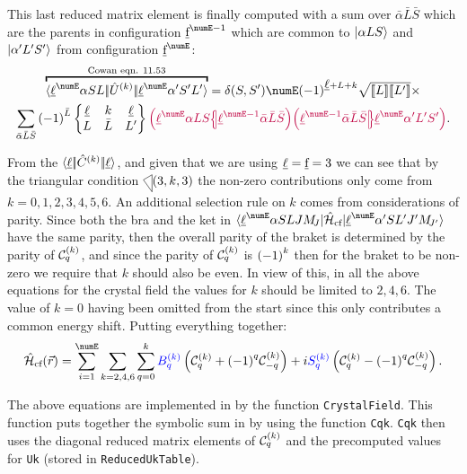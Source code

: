 \documentclass{article}
\newcommand{\codetext}[1]{{\color{BlueViolet} \texttt{#1}}}
\begin{document}
    This last reduced matrix element is finally computed with a sum over $\bar{\alpha}\bar{L}\bar{S}$ which are the parents in configuration $\forb^{\numE-1}$ which are common to $|\alpha L S\rangle$ and $|\alpha' L' S'\rangle$ from configuration $\forb^{\numE}$:
    \begin{multline}
    \overbracket{\redbraopket{\lorb^\numE \alpha S L} 
        {\op{U}^{(k)}}
        {\lorb^\numE \alpha' S' L'}}^{\text{Cowan eqn. 11.53}} = \kronecker{S}{S'} \numE \phaser{\lorb + L + k}
            \sqrt{\tpobraket{L}\tpobraket{L'}} \times \\
    \sum_{\bar{\alpha}\bar{L}\bar{S}} 
        \phaser{\bar{L}} \sixj{\lorb}{k}{\lorb}{L}{\bar{L}}{L'}
        \cfpinv{\lorb^\numE \alpha L S}
            {\lorb^{\numE - 1}\bar{\alpha}\bar{L}\bar{S}}
        \cfp{\lorb^{\numE -1}\bar{\alpha}\bar{L}\bar{S}}{\lorb^\numE\alpha'L'S'}.
    \label{eqn:ReducedUk}
    \end{multline}

    From the $\langle \underbar{$\ell$}|\!|\hat{C}^{(k)}|\!|\underbar{$\ell$}\rangle$, and given that we are using $\underbar{$\ell$} = \underbar{$\text{f}$} = 3$ we can see that by the triangular condition $\tricondition{3,k,3}$ the non-zero contributions only come from $k=0,1,2,3,4,5,6$. An additional selection rule on $k$ comes from considerations of parity. Since both the bra and the ket in $\braopket{\lorb^\numE \alpha SLJ \Msub{J}}{\hamCrystalFieldSymbol}{\lorb^\numE \alpha'S L' J' \Msub{J'}}$ have the same parity, then the overall parity of the braket is determined by the parity of $\mathcal{C}^{(k)}_{q}$, and since the parity of $\mathcal{C}^{(k)}_{q}$ is ${(-1)}^{k}$ then for the braket to be non-zero we require that $k$ should also be even. In view of this, in all the above equations for the crystal field the values for $k$ should be limited to $2,4,6$. The value of $k=0$ having been omitted from the start since this only contributes a common energy shift. Putting everything together:
       	\begin{equation}
        \hamCrystalFieldSymbol(\vec{r}) = 
        	\sum_{i=1}^\numE
        	\sum_{k=2,4,6}
        	\sum_{q=0}^{k} \Bkq{k}{q} \left(\Ckq{k}{q} + \phaser{q}\Ckq{k}{-q}\right) + i \Skq{k}{q} \left(\Ckq{k}{q} - \phaser{q}\Ckq{k}{-q}\right).
    	\label{eqn:supreme crystal sum}
    	\end{equation}

    The above equations are implemented in \qlanth by the function \codetext{CrystalField}. This function puts together the symbolic sum in  by using the function \codetext{Cqk}. \codetext{Cqk} then uses the diagonal reduced matrix elements of $\mathcal{C}^{(k)}_{q}$ and the precomputed values for \codetext{Uk} (stored in \codetext{ReducedUkTable}).
\end{document}
